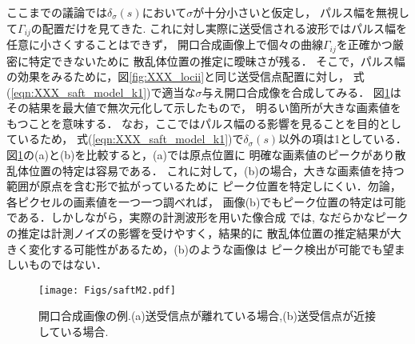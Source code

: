 ここまでの議論では$\delta_\sigma(s)$において$\sigma$が十分小さいと仮定し，
パルス幅を無視して$\Gamma_{ij}$の配置だけを見てきた. 
これに対し実際に送受信される波形ではパルス幅を任意に小さくすることはできず，
開口合成画像上で個々の曲線$\Gamma_{ij}$を正確かつ厳密に特定できないために
散乱体位置の推定に曖昧さが残る．
そこで，パルス幅の効果をみるために，図\ref{fig:XXX_locii}と同じ送受信点配置に対し，
式(\ref{eqn:XXX_saft_model_k1})で適当な$\sigma$与え開口合成像を合成してみる．
図\ref{fig:XXX_saftM2}はその結果を最大値で無次元化して示したもので，
明るい箇所が大きな画素値をもつことを意味する．
なお，ここではパルス幅のる影響を見ることを目的としているため，
式(\ref{eqn:XXX_saft_model_k1})で$\delta_\sigma(s)$以外の項は1としている．
図\ref{fig:XXX_saftM2}の(a)と(b)を比較すると，(a)では原点位置に
明確な画素値のピークがあり散乱体位置の特定は容易である．
これに対して，(b)の場合，大きな画素値を持つ範囲が原点を含む形で拡がっているために
ピーク位置を特定しにくい．勿論，各ピクセルの画素値を一つ一つ調べれば，
画像(b)でもピーク位置の特定は可能である．しかしながら，実際の計測波形を用いた像合成
では, なだらかなピークの推定は計測ノイズの影響を受けやすく，結果的に
散乱体位置の推定結果が大きく変化する可能性があるため，(b)のような画像は
ピーク検出が可能でも望ましいものではない．
\begin{figure}[h]
	\begin{center}
	\texttt{[image: Figs/saftM2.pdf]} 
	\end{center}
	\caption{開口合成画像の例.(a)送受信点が離れている場合,(b)送受信点が近接している場合.} 
	\label{fig:XXX_saftM2}
\end{figure}

